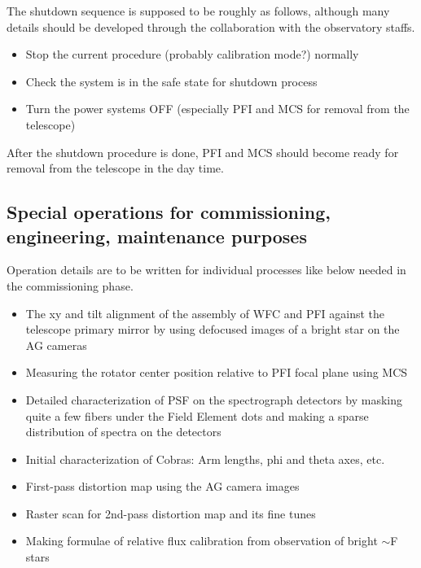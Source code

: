 \documentclass[a4paper]{article}
\begin{document}
The shutdown sequence is supposed to be roughly as follows, although
many details should be developed through the collaboration with the
observatory staffs.

\begin{itemize}
\item Stop the current procedure (probably calibration mode?) normally
\item Check the system is in the safe state for shutdown process
\item Turn the power systems OFF (especially PFI and MCS for removal from the telescope)
\end{itemize}

After the shutdown procedure is done, PFI and MCS should become ready
for removal from the telescope in the day time.

\subsection{Special operations for commissioning, engineering, maintenance purposes\label{sec:detail_ope_plan:engineering}}

Operation details are to be written for individual processes like
below needed in the commissioning phase.

\begin{itemize}
\item The xy and tilt alignment of the assembly of WFC and PFI against
  the telescope primary mirror by using defocused images of a bright
  star on the AG cameras
\item Measuring the rotator center position relative to PFI focal plane using MCS
\item Detailed characterization of PSF on the spectrograph detectors
  by masking quite a few fibers under the Field Element dots and making a sparse distribution of spectra on the detectors
\item Initial characterization of Cobras: Arm lengths, phi and theta axes, etc.
\item First-pass distortion map using the AG camera images
\item Raster scan for 2nd-pass distortion map and its fine tunes
\item Making formulae of relative flux calibration from observation of bright $\sim$F stars

\end{itemize}
\end{document}
